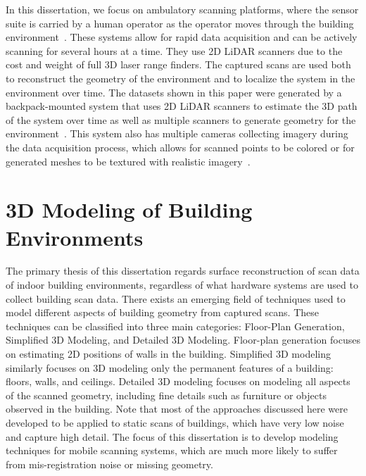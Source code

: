\documentclass[12pt,onecolumn,oneside]{book}
\begin{document}
In this dissertation, we focus on ambulatory scanning platforms, where the sensor suite is carried by a human operator as the operator moves through the building environment~\cite{Sweep,MITBackpack,VillageHeritage}.  These systems allow for rapid data acquisition and can be actively scanning for several hours at a time.  They use 2D LiDAR scanners due to the cost and weight of full 3D laser range finders.  The captured scans are used both to reconstruct the geometry of the environment and to localize the system in the environment over time.  The datasets shown in this paper were generated by a backpack-mounted system that uses 2D LiDAR scanners to estimate the 3D path of the system over time as well as multiple scanners to generate geometry for the environment~\cite{liu2010indoor,Backpack,Localization,NickJournal}.  This system also has multiple cameras collecting imagery during the data acquisition process, which allows for scanned points to be colored or for generated meshes to be textured with realistic imagery~\cite{Cheng14}. 

\section{3D Modeling of Building Environments}
\label{sec:building_meshing}

The primary thesis of this dissertation regards surface reconstruction of scan data of indoor building environments, regardless of what hardware systems are used to collect building scan data.  There exists an emerging field of techniques used to model different aspects of building geometry from captured scans.  These techniques can be classified into three main categories:  Floor-Plan Generation, Simplified 3D Modeling, and Detailed 3D Modeling.  Floor-plan generation focuses on estimating 2D positions of walls in the building.  Simplified 3D modeling similarly focuses on 3D modeling only the permanent features of a building: floors, walls, and ceilings.  Detailed 3D modeling focuses on modeling all aspects of the scanned geometry, including fine details such as furniture or objects observed in the building.  Note that most of the approaches discussed here were developed to be applied to static scans of buildings, which have very low noise and capture high detail. The focus of this dissertation is to develop modeling techniques for mobile scanning systems, which are much more likely to suffer from mis-registration noise or missing geometry.
\end{document}
